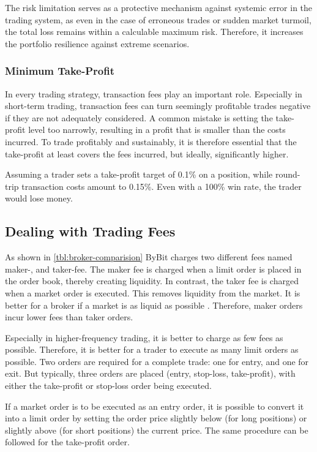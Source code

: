The risk limitation serves as a protective mechanism against systemic error in the trading system, as even in the case of erroneous trades or sudden market turmoil, the total loss remains within a calculable maximum risk.
Therefore, it increases the portfolio resilience against extreme scenarios.

\subsubsection{Minimum Take-Profit}

In every trading strategy, transaction fees play an important role.
Especially in short-term trading, transaction fees can turn seemingly profitable trades negative if they are not adequately considered.
A common mistake is setting the take-profit level too narrowly, resulting in a profit that is smaller than the costs incurred.
To trade profitably and sustainably, it is therefore essential that the take-profit at least covers the fees incurred, but ideally, significantly higher.

Assuming a trader sets a take-profit target of 0.1\% on a position, while round-trip transaction costs amount to 0.15\%.
Even with a 100\% win rate, the trader would lose money.

\subsection{Dealing with Trading Fees}
\label{chap:dealing-with-trading-fees}

As shown in \autoref{tbl:broker-comparision} ByBit charges two different fees named maker-, and taker-fee.
The maker fee is charged when a limit order is placed in the order book, thereby creating liquidity.
In contrast, the taker fee is charged when a market order is executed.
This removes liquidity from the market.
It is better for a broker if a market is as liquid as possible \cite{liquid-markets}.
Therefore, maker orders incur lower fees than taker orders.

Especially in higher-frequency trading, it is better to charge as few fees as possible.
Therefore, it is better for a trader to execute as many limit orders as possible.
Two orders are required for a complete trade: one for entry, and one for exit.
But typically, three orders are placed (entry, stop-loss, take-profit), with either the take-profit or stop-loss order being executed.

If a market order is to be executed as an entry order, it is possible to convert it into a limit order by setting the order price slightly below (for long positions) or slightly above (for short positions) the current price.
The same procedure can be followed for the take-profit order.

